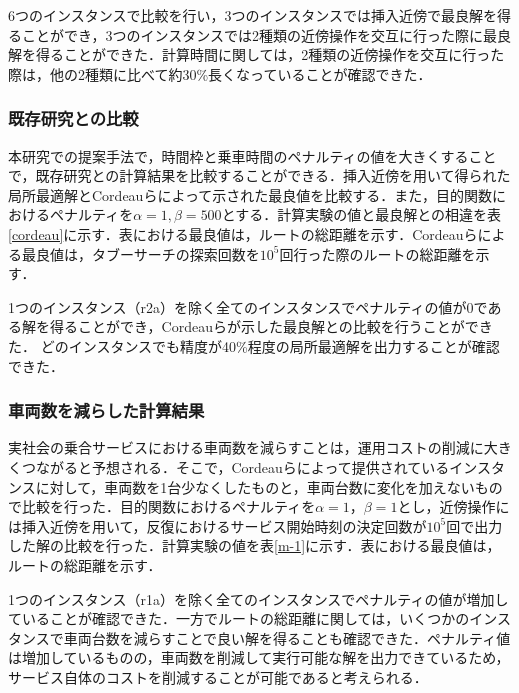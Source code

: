 \documentclass[a4j,11pt,twocolumn]{jsarticle}
\begin{document}
6つのインスタンスで比較を行い，3つのインスタンスでは挿入近傍で最良解を得ることができ，3つのインスタンスでは2種類の近傍操作を交互に行った際に最良解を得ることができた．計算時間に関しては，2種類の近傍操作を交互に行った際は，他の2種類に比べて約30\%長くなっていることが確認できた．


\subsubsection{既存研究との比較}
\label{sec:cordeau}
本研究での提案手法で，時間枠と乗車時間のペナルティの値を大きくすることで，既存研究との計算結果を比較することができる．挿入近傍を用いて得られた局所最適解とCordeauらによって示された最良値を比較する．また，目的関数におけるペナルティを$\alpha=1, \beta=500$とする．計算実験の値と最良解との相違を表\ref{cordeau}に示す．表における最良値は，ルートの総距離を示す．Cordeauらによる最良値は，タブーサーチの探索回数を$10^5$回行った際のルートの総距離を示す．

1つのインスタンス（r2a）を除く全てのインスタンスでペナルティの値が0である解を得ることができ，Cordeauらが示した最良解との比較を行うことができた．
どのインスタンスでも精度が40\%程度の局所最適解を出力することが確認できた．

\subsubsection{車両数を減らした計算結果}
実社会の乗合サービスにおける車両数を減らすことは，運用コストの削減に大きくつながると予想される．そこで，Cordeauらによって提供されているインスタンスに対して，車両数を1台少なくしたものと，車両台数に変化を加えないもので比較を行った．目的関数におけるペナルティを$\alpha=1，\beta=1$とし，近傍操作には挿入近傍を用いて，反復におけるサービス開始時刻の決定回数が$10^5$回で出力した解の比較を行った．計算実験の値を表\ref{m-1}に示す．表における最良値は，ルートの総距離を示す．

1つのインスタンス（r1a）を除く全てのインスタンスでペナルティの値が増加していることが確認できた．一方でルートの総距離に関しては，いくつかのインスタンスで車両台数を減らすことで良い解を得ることも確認できた．ペナルティ値は増加しているものの，車両数を削減して実行可能な解を出力できているため，サービス自体のコストを削減することが可能であると考えられる．
\end{document}
